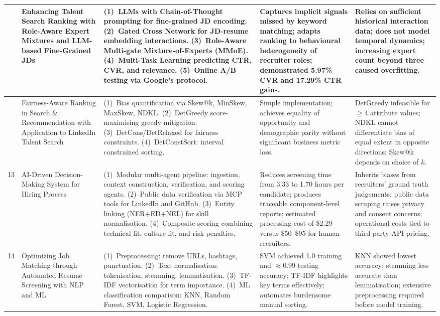 \documentclass[12pt,a4paper]{report}
\begin{document}
\begin{longtable}{|>{\centering\arraybackslash}p{0.6cm}|p{3.1cm}|p{3.6cm}|p{3.2cm}|p{3.2cm}|}
11 &
Enhancing Talent Search Ranking with Role-Aware Expert Mixtures and LLM-based Fine-Grained JDs \cite{ref11} &
(1)~LLMs with Chain-of-Thought prompting for fine-grained JD encoding. (2)~Gated Cross Network for JD-resume embedding interactions. (3)~Role-Aware Multi-gate Mixture-of-Experts (MMoE). (4)~Multi-Task Learning predicting CTR, CVR, and relevance. (5)~Online A/B testing via Google's protocol. &
Captures implicit signals missed by keyword matching; adapts ranking to behavioural heterogeneity of recruiter roles; demonstrated 5.97\% CVR and 17.29\% CTR gains. &
Relies on sufficient historical interaction data; does not model temporal dynamics; increasing expert count beyond three caused overfitting. \\
\hline

12 &
Fairness-Aware Ranking in Search \& Recommendation with Application to LinkedIn Talent Search \cite{ref12} &
(1)~Bias quantification via Skew@k, MinSkew, MaxSkew, NDKL. (2)~DetGreedy score-maximising greedy mitigation. (3)~DetCons/DetRelaxed for fairness constraints. (4)~DetConstSort: interval constrained sorting. &
Simple implementation; achieves equality of opportunity and demographic parity without significant business metric loss. &
DetGreedy infeasible for $\geq$4 attribute values; NDKL cannot differentiate bias of equal extent in opposite directions; Skew@k depends on choice of $k$. \\
\hline

13 &
AI-Driven Decision-Making System for Hiring Process \cite{ref13} &
(1)~Modular multi-agent pipeline: ingestion, context construction, verification, and scoring agents. (2)~Public data verification via MCP tools for LinkedIn and GitHub. (3)~Entity linking (NER+ED+NEL) for skill normalisation. (4)~Composite scoring combining technical fit, culture fit, and risk penalties. &
Reduces screening time from 3.33 to 1.70 hours per candidate; produces traceable component-level reports; estimated processing cost of \$2.29 versus \$50--\$95 for human recruiters. &
Inherits biases from recruiters' ground truth judgements; public data scraping raises privacy and consent concerns; operational costs tied to third-party API pricing. \\
\hline

14 &
Optimizing Job Matching through Automated Resume Screening with NLP and ML \cite{ref14} &
(1)~Preprocessing: remove URLs, hashtags, punctuation. (2)~Text normalisation: tokenisation, stemming, lemmatisation. (3)~TF-IDF vectorisation for term importance. (4)~ML classification comparison: KNN, Random Forest, SVM, Logistic Regression. &
SVM achieved 1.0 training and $\approx$0.99 testing accuracy; TF-IDF highlights key terms effectively; automates burdensome manual sorting. &
KNN showed lowest accuracy; stemming less accurate than lemmatisation; extensive preprocessing required before model training. \\
\hline


\end{longtable}
\end{document}
